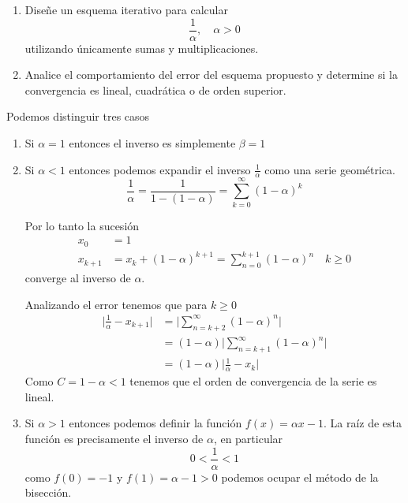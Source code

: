 \documentclass[11pt, oneside]{article}
\begin{document}
\begin{problema}\leavevmode
    \begin{enumerate}
        \item Diseñe un esquema iterativo para calcular \[\frac{1}{\alpha},\quad\alpha>0\]utilizando únicamente sumas y multiplicaciones.
            

        \item Analice el comportamiento del error del esquema propuesto y determine si la convergencia es lineal, cuadrática o de orden superior.
    \end{enumerate}

    Podemos distinguir tres casos 
    \begin{enumerate}
        \item Si \(\alpha=1\) entonces el inverso es simplemente \(\beta=1\)
        \item Si \(\alpha<1\) entonces podemos expandir el inverso \(\frac{1}{\alpha}\) como una serie geométrica. 
        \begin{equation}
            \frac{1}{\alpha}=\frac{1}{1-(1-\alpha)}=\sum_{k=0}^\infty(1-\alpha)^k
        \end{equation}
        
        Por lo tanto la sucesión 
        \begin{align*}
            x_0&=1\\
            x_{k+1}&=x_k+(1-\alpha)^{k+1}=\sum_{n=0}^{k+1}(1-\alpha)^n\quad k\ge0
        \end{align*}
        converge al inverso de \(\alpha\).

        Analizando el error tenemos que para $k\ge0$
        \begin{align*}
            \bigg|\frac{1}{\alpha}-x_{k+1}\bigg|&=\bigg|\sum_{n=k+2}^\infty(1-\alpha)^n\bigg|\\
            &=(1-\alpha)\bigg|\sum_{n=k+1}^\infty(1-\alpha)^n\bigg|\\
            &=(1-\alpha)\bigg|\frac{1}{\alpha}-x_{k}\bigg|
        \end{align*}
        Como $C=1-\alpha<1$ tenemos que el orden de convergencia de la serie es lineal. 
        \item Si \(\alpha>1\) entonces podemos definir la función \(f(x)=\alpha x-1\). La raíz de esta función es precisamente el inverso de \(\alpha\), en particular \[0<\frac{1}{\alpha}<1\] como \(f(0)=-1\) y \(f(1)=\alpha-1>0\) podemos ocupar el método de la bisección. 
    \end{enumerate}

\end{problema}
\end{document}
